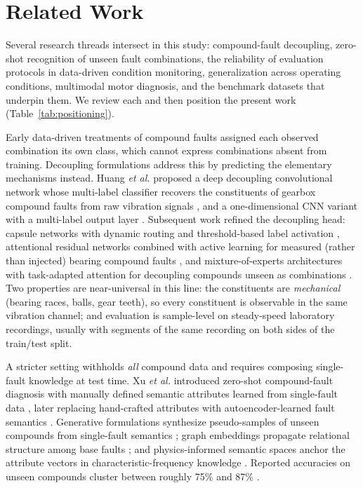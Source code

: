 \section{Related Work}
\label{sec:related}

Several research threads intersect in this study: compound-fault
decoupling, zero-shot recognition of unseen fault combinations, the
reliability of evaluation protocols in data-driven condition monitoring,
generalization across operating conditions, multimodal motor diagnosis, and
the benchmark datasets that underpin them. We review each and then position
the present work (Table~\ref{tab:positioning}).

Early data-driven treatments of compound faults assigned each observed
combination its own class, which cannot express combinations absent from
training. Decoupling formulations address this by predicting the elementary
mechanisms instead. Huang \emph{et al.} proposed a deep decoupling
convolutional network whose multi-label classifier recovers the
constituents of gearbox compound faults from raw vibration signals
\cite{huang2019ddcnn}, and a one-dimensional CNN variant with a multi-label
output layer \cite{huang2019multilabel}. Subsequent work refined the
decoupling head: capsule networks with dynamic routing and threshold-based
label activation \cite{ltssbow2024}, attentional residual networks combined
with active learning for measured (rather than injected) bearing compound
faults \cite{decoupling_attn2020}, and mixture-of-experts architectures
with task-adapted attention for decoupling compounds unseen as combinations
\cite{hemtan2024}. Two properties are near-universal in this line: the
constituents are \emph{mechanical} (bearing races, balls, gear teeth), so
every constituent is observable in the same vibration channel; and
evaluation is sample-level on steady-speed laboratory recordings, usually
with segments of the same recording on both sides of the train/test split.

A stricter setting withholds \emph{all} compound data and requires
composing single-fault knowledge at test time. Xu \emph{et al.} introduced
zero-shot compound-fault diagnosis with manually defined semantic
attributes learned from single-fault data \cite{eswa2022}, later replacing
hand-crafted attributes with autoencoder-learned fault semantics
\cite{eswa2023}. Generative formulations synthesize pseudo-samples of
unseen compounds from single-fault semantics \cite{zsl2021,kbs2025}; graph
embeddings propagate relational structure among base faults
\cite{neuro2025}; and physics-informed semantic spaces anchor the attribute
vectors in characteristic-frequency knowledge \cite{song2025gzsl}. Reported
accuracies on unseen compounds cluster between roughly 75\% and 87\%
\cite{eswa2022,eswa2023,song2025gzsl,appac2025}.

